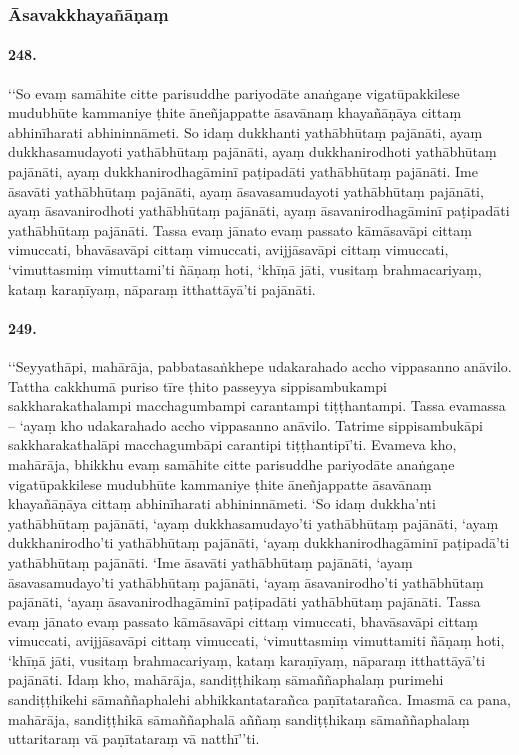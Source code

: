 \subsubsection{Āsavakkhayañāṇaṃ}

\paragraph{248.} ‘‘So evaṃ samāhite citte parisuddhe pariyodāte anaṅgaṇe vigatūpakkilese mudubhūte kammaniye ṭhite āneñjappatte āsavānaṃ khayañāṇāya cittaṃ abhinīharati abhininnāmeti. So idaṃ dukkhanti yathābhūtaṃ pajānāti, ayaṃ dukkhasamudayoti yathābhūtaṃ pajānāti, ayaṃ dukkhanirodhoti yathābhūtaṃ pajānāti, ayaṃ dukkhanirodhagāminī paṭipadāti yathābhūtaṃ pajānāti. Ime āsavāti yathābhūtaṃ pajānāti, ayaṃ āsavasamudayoti yathābhūtaṃ pajānāti, ayaṃ āsavanirodhoti yathābhūtaṃ pajānāti, ayaṃ āsavanirodhagāminī paṭipadāti yathābhūtaṃ pajānāti. Tassa evaṃ jānato evaṃ passato kāmāsavāpi cittaṃ vimuccati, bhavāsavāpi cittaṃ vimuccati, avijjāsavāpi cittaṃ vimuccati, ‘vimuttasmiṃ vimuttami’ti ñāṇaṃ hoti, ‘khīṇā jāti, vusitaṃ brahmacariyaṃ, kataṃ karaṇīyaṃ, nāparaṃ itthattāyā’ti pajānāti.

\paragraph{249.} ‘‘Seyyathāpi, mahārāja, pabbatasaṅkhepe udakarahado accho vippasanno anāvilo. Tattha cakkhumā puriso tīre ṭhito passeyya sippisambukampi sakkharakathalampi macchagumbampi carantampi tiṭṭhantampi. Tassa evamassa – ‘ayaṃ kho udakarahado accho vippasanno anāvilo. Tatrime sippisambukāpi sakkharakathalāpi macchagumbāpi carantipi tiṭṭhantipī’ti. Evameva kho, mahārāja, bhikkhu evaṃ samāhite citte parisuddhe pariyodāte anaṅgaṇe vigatūpakkilese mudubhūte kammaniye ṭhite āneñjappatte āsavānaṃ khayañāṇāya cittaṃ abhinīharati abhininnāmeti. ‘So idaṃ dukkha’nti yathābhūtaṃ pajānāti, ‘ayaṃ dukkhasamudayo’ti yathābhūtaṃ pajānāti, ‘ayaṃ dukkhanirodho’ti yathābhūtaṃ pajānāti, ‘ayaṃ dukkhanirodhagāminī paṭipadā’ti yathābhūtaṃ pajānāti. ‘Ime āsavāti yathābhūtaṃ pajānāti, ‘ayaṃ āsavasamudayo’ti yathābhūtaṃ pajānāti, ‘ayaṃ āsavanirodho’ti yathābhūtaṃ pajānāti, ‘ayaṃ āsavanirodhagāminī paṭipadāti yathābhūtaṃ pajānāti. Tassa evaṃ jānato evaṃ passato kāmāsavāpi cittaṃ vimuccati, bhavāsavāpi cittaṃ vimuccati, avijjāsavāpi cittaṃ vimuccati, ‘vimuttasmiṃ vimuttamiti ñāṇaṃ hoti, ‘khīṇā jāti, vusitaṃ brahmacariyaṃ, kataṃ karaṇīyaṃ, nāparaṃ itthattāyā’ti pajānāti. Idaṃ kho, mahārāja, sandiṭṭhikaṃ sāmaññaphalaṃ purimehi sandiṭṭhikehi sāmaññaphalehi abhikkantatarañca paṇītatarañca. Imasmā ca pana, mahārāja, sandiṭṭhikā sāmaññaphalā aññaṃ sandiṭṭhikaṃ sāmaññaphalaṃ uttaritaraṃ vā paṇītataraṃ vā natthī’’ti.


